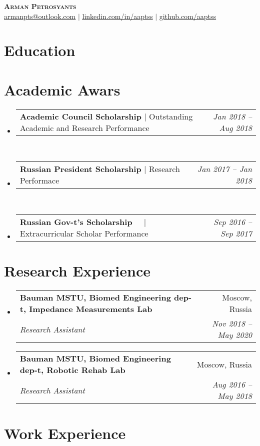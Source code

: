 \documentclass[a4paper,11pt]{article}
\makeatletter
\newcommand{\resumeSubheading}[4]{
  \vspace{-2pt}\item
    \begin{tabular*}{0.97\textwidth}[t]{l@{\extracolsep{\fill}}r}
      \textbf{#1} & #2 \\
      \textit{\small#3} & \textit{\small #4} \\
    \end{tabular*}\vspace{-7pt}
}
\newcommand{\resumeProjectHeading}[2]{
    \item
    \begin{tabular*}{0.97\textwidth}{l@{\extracolsep{\fill}}r}
      \small#1 & #2 \\
    \end{tabular*}\vspace{-7pt}
}
\newcommand{\resumeSubHeadingListStart}{\begin{itemize}[leftmargin=0.15in, label={}]}
\newcommand{\resumeSubHeadingListEnd}{\end{itemize}}
\newcommand{\DesPosition}{ }
\makeatother
\begin{document}
\begin{center}
    \textbf{\Huge \scshape Arman Petrosyants \DesPosition } \\ \vspace{1pt}
    \href{mailto:armanpts@outlook.com}{\underline{armanpts@outlook.com}} $|$ 
    \href{https://linkedin.com/in/aaptss}{\underline{linkedin.com/in/aaptss}} $|$
    \href{https://github.com/aaptss}{\underline{github.com/aaptss}}
\end{center}

\section{Education}
  \resumeSubHeadingListStart
	
	
	
  \resumeSubHeadingListEnd

\section{Academic Awars}
    \resumeSubHeadingListStart      
      \resumeProjectHeading
          {\textbf{Academic Council Scholarship} $|$ {Outstanding Academic and Research Performance}}{\emph{Jan 2018 -- Aug 2018}}\\
      \resumeProjectHeading
          {\textbf{Russian President Scholarship} $|$ {Research Performace}}{\emph{Jan 2017 -- Jan 2018}}\\
      \resumeProjectHeading
          {\textbf{Russian Gov-t's Scholarship} $\> \> \> \> \> |$ {Extracurricular Scholar Performance}}{\emph{Sep 2016 -- Sep 2017}}
    \resumeSubHeadingListEnd

\section{Research Experience}
  \resumeSubHeadingListStart
	
    \resumeSubheading
      {Bauman MSTU, Biomed Engineering dep-t, Impedance Measurements Lab}{Moscow, Russia}
      {Research Assistant}{Nov 2018 -- May 2020}
	
	
    \resumeSubheading
      {Bauman MSTU, Biomed Engineering dep-t, Robotic Rehab Lab}{Moscow, Russia}
      {Research Assistant}{Aug 2016 -- May 2018}
	
  	
  \resumeSubHeadingListEnd

\section{Work Experience}
  \resumeSubHeadingListStart
%	
 	 
%	
 	 
  \resumeSubHeadingListEnd
\end{document}
